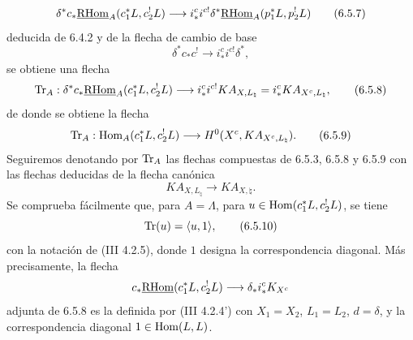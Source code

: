 \begin{equation}
\delta^*c_*\underline{\mathrm{RHom}}_A(c_1^*L,c_2^!L)
\longrightarrow
i_*^ci^{c!}\delta^*\underline{\mathrm{RHom}}_A(p_1^*L,p_2^!L)
\tag{6.5.7}
\end{equation}
deducida de 6.4.2 y de la flecha de cambio de base
\[
\delta^*c_*c^!\longrightarrow i_*^ci^{c!}\delta^*,
\]
se obtiene una flecha
\begin{equation}
\operatorname{Tr}_A:\delta^*c_*\underline{\mathrm{RHom}}_A(c_1^*L,c_2^!L)
\longrightarrow
i_*^ci^{c!}KA_{X,L_{\natural}}
=i_*^cKA_{X^c,L_{\natural}},
\tag{6.5.8}
\end{equation}
de donde se obtiene la flecha
\begin{equation}
\operatorname{Tr}_A:\operatorname{Hom}_A(c_1^*L,c_2^!L)
\longrightarrow
H^0(X^c,KA_{X^c,L_{\natural}}).
\tag{6.5.9}
\end{equation}
Seguiremos denotando por $\operatorname{Tr}_A$ las flechas compuestas de 6.5.3, 6.5.8 y 6.5.9 con las flechas deducidas de la flecha canónica
\[
KA_{X,L_{\natural}}\longrightarrow KA_{X,\natural}.
\]
Se comprueba fácilmente que, para $A=\Lambda$, para $u\in\operatorname{Hom}(c_1^*L,c_2^!L)$, se tiene
\begin{equation}
\operatorname{Tr}(u)=\langle u,1\rangle,
\tag{6.5.10}
\end{equation}
con la notación de (III 4.2.5), donde $1$ designa la correspondencia diagonal. Más precisamente, la flecha
\[
c_*\underline{\mathrm{RHom}}(c_1^*L,c_2^!L)\longrightarrow \delta_*i_*^cK_{X^c}
\]
adjunta de 6.5.8 es la definida por (III 4.2.4') con $X_1=X_2$, $L_1=L_2$, $d=\delta$, y la correspondencia diagonal $1\in\operatorname{Hom}(L,L)$.
